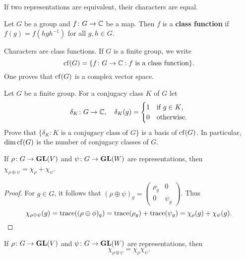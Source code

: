 If two representations are equivalent, their characters are equal.

\begin{definition}
	Let $G$ be a group and 
	$f\colon G\to\mathbb{C}$ be a map. Then $f$ is a \textbf{class function} if
	$f(g)=f(hgh^{-1})$ for all $g,h\in G$. 	
\end{definition}

Characters are class functions. If $G$ is a finite group, 
we write 
\[
\operatorname{cf}(G)=\{f\colon G\to\mathbb{C}:f\text{ is a class function}\}.
\]
One proves that $\operatorname{cf}(G)$ is a complex vector space. 

\begin{exercise}
    Let $G$ be a finite group. For a conjugacy class $K$ of $G$
    let 
    \[
    \delta_K\colon G\to\mathbb{C},
    \quad
    \delta_K(g)=\begin{cases}
        1 & \text{if $g\in K$,}\\
        0 & \text{otherwise}.
        \end{cases}
    \]
    Prove that $\{\delta_K:K\text{ is a conjugacy class of $G$}\}$ is a basis of $\operatorname{cf}(G)$. 
    In particular, $\dim\operatorname{cf}(G)$ is the number of conjugacy classes of $G$. 
\end{exercise}

\begin{proposition}
    If $\rho\colon G\to\mathbf{GL}(V)$ and
    $\psi\colon G\to\mathbf{GL}(W)$ are representations, then
    $\chi_{\rho\oplus\psi}=\chi_\rho+\chi_\psi$.
\end{proposition}

\begin{proof}
  For $g\in G$, it follows that 
  $(\rho\oplus\psi)_g=
  \begin{pmatrix}
    \rho_g & 0\\ 
    0 & \psi_g
  \end{pmatrix}$. 
  Thus  
  \[
    \chi_{\rho\oplus\psi}(g)=\operatorname{trace}((\rho\oplus\phi)_g)=\operatorname{trace}(\rho_g)+\operatorname{trace}(\psi_g)=\chi_\rho(g)+\chi_\psi(g).\qedhere
  \]
\end{proof}

\begin{proposition}
  	If $\rho\colon G\to\mathbf{GL}(V)$ and
    $\psi\colon G\to\mathbf{GL}(W)$ are representations, then
    \[
    \chi_{\rho\otimes\psi}=\chi_\rho\chi_\psi.
    \]
\end{proposition}

